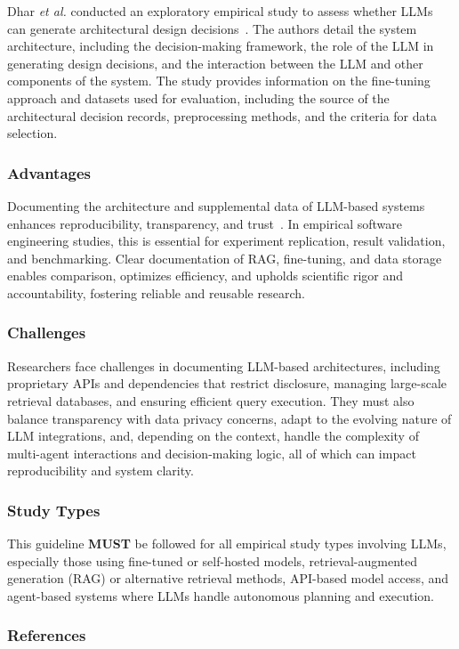 \documentclass[11pt]{article}
\newcommand{\must}{\textbf{MUST}\xspace}
\begin{document}
Dhar \textit{et al.} conducted an exploratory empirical study to assess whether LLMs can generate architectural design decisions~\cite{DBLP:conf/icsa/DharVV24}. The authors detail the system architecture, including the decision-making framework, the role of the LLM in generating design decisions, and the interaction between the LLM and other components of the system. The study provides information on the fine-tuning approach and datasets used for evaluation, including the source of the architectural decision records, preprocessing methods, and the criteria for data selection. 

\subsubsection{Advantages}

Documenting the architecture and supplemental data of LLM-based systems enhances reproducibility, transparency, and trust~\cite{DBLP:journals/software/LuZXXW24}. In empirical software engineering studies, this is essential for experiment replication, result validation, and benchmarking. Clear documentation of RAG, fine-tuning, and data storage enables comparison, optimizes efficiency, and upholds scientific rigor and accountability, fostering reliable and reusable research.

\subsubsection{Challenges}

Researchers face challenges in documenting LLM-based architectures, including proprietary APIs and dependencies that restrict disclosure, managing large-scale retrieval databases, and ensuring efficient query execution. They must also balance transparency with data privacy concerns, adapt to the evolving nature of LLM integrations, and, depending on the context, handle the complexity of multi-agent interactions and decision-making logic, all of which can impact reproducibility and system clarity.

\subsubsection{Study Types}

This guideline \must be followed for all empirical study types involving LLMs, especially those using fine-tuned or self-hosted models, retrieval-augmented generation (RAG) or alternative retrieval methods, API-based model access, and agent-based systems where LLMs handle autonomous planning and execution.

\subsubsection{References}



\end{document}
